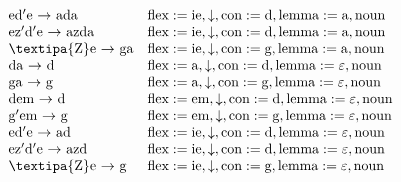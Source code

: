 \documentclass{beamer}
\begin{document}
\begin{frame}
\begin{scriptsize}
\[\begin{array}{ll}
\text{ed$'$e $\rightarrow$ ada} & \text{flex}:=\text{ie}, \downarrow, \text{con}:=\text{d}, \text{lemma}:=\text{a}, \text{noun}\\
\text{ez$'$d$'$e $\rightarrow$ azda} & \text{flex}:=\text{ie}, \downarrow, \text{con}:=\text{d}, \text{lemma}:=\text{a}, \text{noun}\\
\text{\textipa{Z}e $\rightarrow$ ga} & \text{flex}:=\text{ie}, \downarrow, \text{con}:=\text{g}, \text{lemma}:=\text{a}, \text{noun}\\
\text{da $\rightarrow$ d} & \text{flex}:=\text{a}, \downarrow, \text{con}:=\text{d}, \text{lemma}:=\text{$\varepsilon$}, \text{noun}\\
\text{ga $\rightarrow$ g} & \text{flex}:=\text{a}, \downarrow, \text{con}:=\text{g}, \text{lemma}:=\text{$\varepsilon$}, \text{noun}\\
\text{dem $\rightarrow$ d} & \text{flex}:=\text{em}, \downarrow, \text{con}:=\text{d}, \text{lemma}:=\text{$\varepsilon$}, \text{noun}\\
\text{g$'$em $\rightarrow$ g} & \text{flex}:=\text{em}, \downarrow, \text{con}:=\text{g}, \text{lemma}:=\text{$\varepsilon$}, \text{noun}\\
\text{ed$'$e $\rightarrow$ ad} & \text{flex}:=\text{ie}, \downarrow, \text{con}:=\text{d}, \text{lemma}:=\text{$\varepsilon$}, \text{noun}\\
\text{ez$'$d$'$e $\rightarrow$ azd} & \text{flex}:=\text{ie}, \downarrow, \text{con}:=\text{d}, \text{lemma}:=\text{$\varepsilon$}, \text{noun}\\
\text{\textipa{Z}e $\rightarrow$ g} & \text{flex}:=\text{ie}, \downarrow, \text{con}:=\text{g}, \text{lemma}:=\text{$\varepsilon$}, \text{noun}\\
\end{array}
\]\end{scriptsize}
\end{frame}
\end{document}

